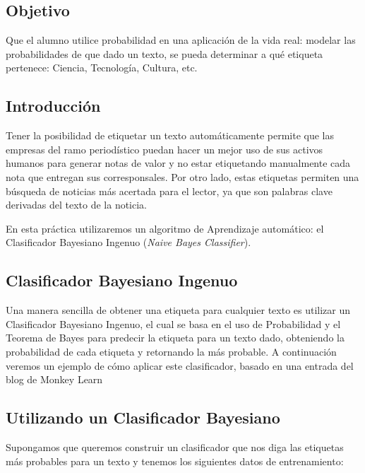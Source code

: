 \subsection{Objetivo}
Que el alumno utilice probabilidad en una aplicación de la vida real: modelar las probabilidades de que dado un texto, se pueda determinar a qué etiqueta pertenece: Ciencia, Tecnología, Cultura, etc. \par

\subsection{Introducción} 

Tener la posibilidad de etiquetar un texto automáticamente permite que las empresas del ramo periodístico puedan hacer un mejor uso de sus activos humanos para generar notas de valor y no estar etiquetando manualmente cada nota que entregan sus corresponsales. Por otro lado, estas etiquetas permiten una búsqueda de noticias más acertada para el lector, ya que son palabras clave derivadas del texto de la noticia.

En esta práctica utilizaremos un algoritmo de Aprendizaje automático: el Clasificador Bayesiano Ingenuo (\textit{Naive Bayes Classifier}).

\subsection{Clasificador Bayesiano Ingenuo}

Una manera sencilla de obtener una etiqueta para cualquier texto es utilizar un Clasificador Bayesiano Ingenuo, el cual se basa en el uso de Probabilidad y el Teorema de Bayes para predecir la etiqueta para un texto dado, obteniendo la probabilidad de cada etiqueta y retornando la más probable. A continuación veremos un ejemplo de cómo aplicar este clasificador, basado en una entrada del blog de Monkey Learn \parencite{Stecanella2017}


\subsection{Utilizando un Clasificador Bayesiano}

Supongamos que queremos construir un clasificador que nos diga las etiquetas más probables para un texto y tenemos los siguientes datos de entrenamiento:

